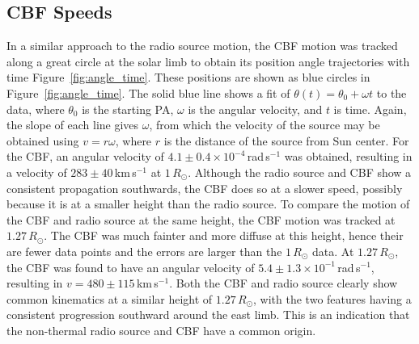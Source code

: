 \subsection{CBF Speeds}
In a similar approach to the radio source motion, the CBF motion was tracked along a great circle at the solar limb to obtain its position angle trajectories with time Figure~\ref{fig:angle_time}. These positions are shown as blue circles in Figure~\ref{fig:angle_time}. The solid blue line shows a fit of $\theta(t) = \theta_0 + \omega t$ to the data, where $\theta_0$ is the starting PA, $\omega$ is the angular velocity, and $t$ is time. Again, the slope of each line gives $\omega$, from which the velocity of the source may be obtained using $v=r\omega$, where $r$ is the distance of the source from Sun center. 
For the CBF, an angular velocity of $4.1\pm0.4\times10^{-4}$\,rad\,s$^{-1}$ was obtained, resulting in a velocity of $283\pm40$\,km\,s$^{-1}$ at $1\,R_{\odot}$. Although the radio source and CBF show a consistent propagation southwards, the CBF does so at a slower speed, possibly because it is at a smaller height than the radio source. To compare the motion of the CBF and radio source at the same height, the CBF motion was tracked at $1.27\,R_{\odot}$. The CBF was much fainter and more diffuse at this height, hence their are fewer data points and the errors are larger than the $1\,R_{\odot}$ data. At $1.27\,R_{\odot}$, the CBF was found to have an angular velocity of $5.4\pm1.3\times10^{-1}$\,rad\,s$^{-1}$, resulting in $v=480\pm115$\,km\,s$^{-1}$. Both the CBF and radio source clearly show common kinematics at a similar height of $1.27\,R_{\odot}$, with the two features having a consistent progression southward around the east limb. This is an indication that the non-thermal radio source and CBF have a common origin.

